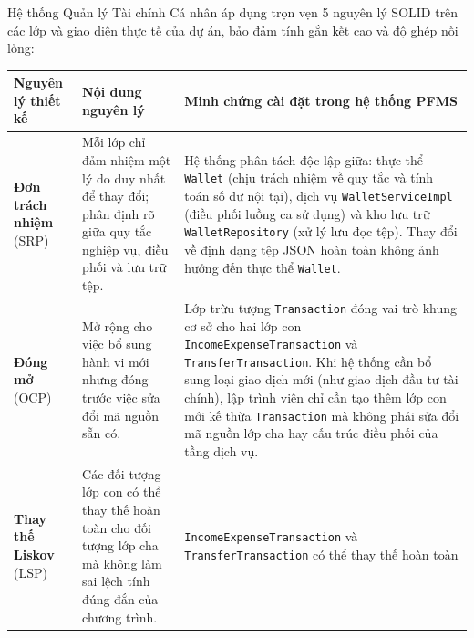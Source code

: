 \documentclass[a4paper,12pt]{report}
\newcommand{\passthrough}[1]{#1}
\newcounter{none}
\begin{document}
Hệ thống Quản lý Tài chính Cá nhân áp dụng trọn vẹn 5 nguyên lý SOLID
trên các lớp và giao diện thực tế của dự án, bảo đảm tính gắn kết cao và
độ ghép nối lỏng:

{\def\LTcaptype{none} %
\begin{longtable}[]{@{}
  >{\raggedright\arraybackslash}p{}
  >{\raggedright\arraybackslash}p{}
  >{\raggedright\arraybackslash}p{}@{}}
\toprule\noalign{}
\begin{minipage}[b]{\linewidth}\raggedright
Nguyên lý thiết kế
\end{minipage} & \begin{minipage}[b]{\linewidth}\raggedright
Nội dung nguyên lý
\end{minipage} & \begin{minipage}[b]{\linewidth}\raggedright
Minh chứng cài đặt trong hệ thống PFMS
\end{minipage} \\
\midrule\noalign{}
\endhead
\bottomrule\noalign{}
\endlastfoot
\textbf{Đơn trách nhiệm} (SRP) & Mỗi lớp chỉ đảm nhiệm một lý do duy
nhất để thay đổi; phân định rõ giữa quy tắc nghiệp vụ, điều phối và lưu
trữ tệp. & Hệ thống phân tách độc lập giữa: thực thể
\passthrough{\lstinline!Wallet!} (chịu trách nhiệm về quy tắc và tính
toán số dư nội tại), dịch vụ \passthrough{\lstinline!WalletServiceImpl!}
(điều phối luồng ca sử dụng) và kho lưu trữ
\passthrough{\lstinline!WalletRepository!} (xử lý lưu đọc tệp). Thay đổi
về định dạng tệp JSON hoàn toàn không ảnh hưởng đến thực thể
\passthrough{\lstinline!Wallet!}. \\
\textbf{Đóng mở} (OCP) & Mở rộng cho việc bổ sung hành vi mới nhưng đóng
trước việc sửa đổi mã nguồn sẵn có. & Lớp trừu tượng
\passthrough{\lstinline!Transaction!} đóng vai trò khung cơ sở cho hai
lớp con \passthrough{\lstinline!IncomeExpenseTransaction!} và
\passthrough{\lstinline!TransferTransaction!}. Khi hệ thống cần bổ sung
loại giao dịch mới (như giao dịch đầu tư tài chính), lập trình viên chỉ
cần tạo thêm lớp con mới kế thừa \passthrough{\lstinline!Transaction!}
mà không phải sửa đổi mã nguồn lớp cha hay cấu trúc điều phối của tầng
dịch vụ. \\
\textbf{Thay thế Liskov} (LSP) & Các đối tượng lớp con có thể thay thế
hoàn toàn cho đối tượng lớp cha mà không làm sai lệch tính đúng đắn của
chương trình. & \passthrough{\lstinline!IncomeExpenseTransaction!} và
\passthrough{\lstinline!TransferTransaction!} có thể thay thế hoàn toàn

\end{longtable}}
\end{document}
